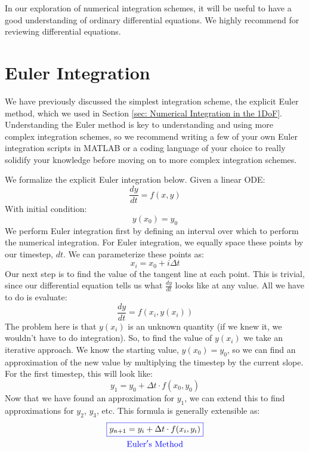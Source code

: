 \documentclass[12pt]{report}
\begin{document}
In our exploration of numerical integration schemes, it will be useful to have a good understanding of ordinary differential equations. We highly recommend \cite{dawkins_differential_2023} for reviewing differential equations.

\section{Euler Integration}\label{sec:euler integration}
We have previously discussed the simplest integration scheme, the explicit Euler method, which we used in Section \ref{sec: Numerical Integration in the 1DoF}. Understanding the Euler method is key to understanding and using more complex integration schemes, so we recommend writing a few of your own Euler integration scripts in MATLAB or a coding language of your choice to really solidify your knowledge before moving on to more complex integration schemes. 

We formalize the explicit Euler integration below. Given a linear ODE:
$$\frac{dy}{dt}=f\left(x,y\right)$$
With initial condition:
$$y(x_0)=y_0$$
We perform Euler integration first by defining an interval over which to perform the numerical integration. For Euler integration, we equally space these points by our timestep, $dt$. We can parameterize these points as:
$$x_i=x_0+i\Delta t$$
Our next step is to find the value of the tangent line at each point. This is trivial, since our differential equation tells us what $\frac{dy}{dt}$ looks like at any value. All we have to do is evaluate:
$$\frac{dy}{dt}=f\left(x_i,y(x_i)\right)$$
The problem here is that $y(x_i)$ is an unknown quantity (if we knew it, we wouldn’t have to do integration). So, to find the value of $y(x_i)$ we take an iterative approach. We know the starting value, $y(x_0)=y_0$, so we can find an approximation of the new value by multiplying the timestep by the current slope. For the first timestep, this will look like:
$$y_1=y_0+\Delta t\cdot f(x_0,y_0)$$
Now that we have found an approximation for $y_1$, we can extend this to find approximations for $y_2$, $y_3$, etc. This formula is generally extensible as:
\begin{gather}
    \color{blue}\boxed{\color{black}y_{n+1}=y_i+\Delta t \cdot f(x_i,y_i)}\\
    \color{blue}\mathrm{Euler's \ Method}
\end{gather}
\end{document}
